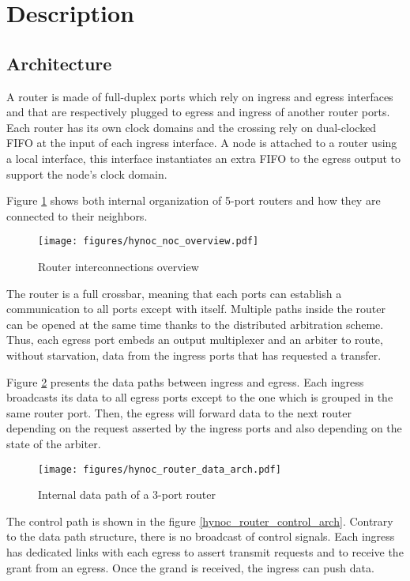\section{Description}
\subsection{Architecture}

A router is made of full-duplex ports which rely on ingress and egress interfaces and that are respectively plugged to
egress and ingress of another router ports. Each router has its own clock domains and the crossing rely on dual-clocked
FIFO at the input of each ingress interface. A node is attached to a router using a local interface, this interface
instantiates an extra FIFO to the egress output to support the node's clock domain.

Figure \ref{hynoc_noc_overview} shows both internal organization of 5-port routers and how they are connected to their
neighbors.

\begin{figure}[H]
  \centering
  \texttt{[image: figures/hynoc\_noc\_overview.pdf]}
  \caption{Router interconnections overview}
  \label{hynoc_noc_overview}
\end{figure}

The router is a full crossbar, meaning that each ports can establish a communication to all ports except with
itself. Multiple paths inside the router can be opened at the same time thanks to the distributed arbitration
scheme. Thus, each egress port embeds an output multiplexer and an arbiter to route, without starvation, data from the
ingress ports that has requested a transfer.

Figure \ref{hynoc_router_data_arch} presents the data paths between ingress and egress. Each ingress broadcasts its data
to all egress ports except to the one which is grouped in the same router port. Then, the egress will forward data to
the next router depending on the request asserted by the ingress ports and also depending on the state of the arbiter.

\begin{figure}[H]
  \centering
  \texttt{[image: figures/hynoc\_router\_data\_arch.pdf]}
  \caption{Internal data path of a 3-port router}
  \label{hynoc_router_data_arch}
\end{figure}

The control path is shown in the figure \ref{hynoc_router_control_arch}. Contrary to the data path structure, there is
no broadcast of control signals. Each ingress has dedicated links with each egress to assert transmit requests and to
receive the grant from an egress. Once the grand is received, the ingress can push data.


